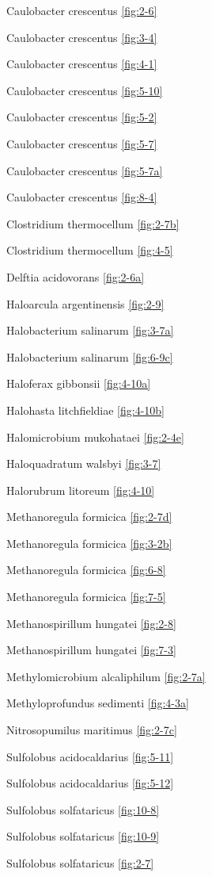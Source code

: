 \documentclass[]{tufte-book}
\begin{document}
Caulobacter crescentus \ref{fig:2-6}

Caulobacter crescentus \ref{fig:3-4}

Caulobacter crescentus \ref{fig:4-1}

Caulobacter crescentus \ref{fig:5-10}

Caulobacter crescentus \ref{fig:5-2}

Caulobacter crescentus \ref{fig:5-7}

Caulobacter crescentus \ref{fig:5-7a}

Caulobacter crescentus \ref{fig:8-4}

Clostridium thermocellum \ref{fig:2-7b}

Clostridium thermocellum \ref{fig:4-5}

Delftia acidovorans \ref{fig:2-6a}

Haloarcula argentinensis \ref{fig:2-9}

Halobacterium salinarum \ref{fig:3-7a}

Halobacterium salinarum \ref{fig:6-9c}

Haloferax gibbonsii \ref{fig:4-10a}

Halohasta litchfieldiae \ref{fig:4-10b}

Halomicrobium mukohataei \ref{fig:2-4e}

Haloquadratum walsbyi \ref{fig:3-7}

Halorubrum litoreum \ref{fig:4-10}

Methanoregula formicica \ref{fig:2-7d}

Methanoregula formicica \ref{fig:3-2b}

Methanoregula formicica \ref{fig:6-8}

Methanoregula formicica \ref{fig:7-5}

Methanospirillum hungatei \ref{fig:2-8}

Methanospirillum hungatei \ref{fig:7-3}

Methylomicrobium alcaliphilum \ref{fig:2-7a}

Methyloprofundus sedimenti \ref{fig:4-3a}

Nitrosopumilus maritimus \ref{fig:2-7c}

Sulfolobus acidocaldarius \ref{fig:5-11}

Sulfolobus acidocaldarius \ref{fig:5-12}

Sulfolobus solfataricus \ref{fig:10-8}

Sulfolobus solfataricus \ref{fig:10-9}

Sulfolobus solfataricus \ref{fig:2-7}
\end{document}
